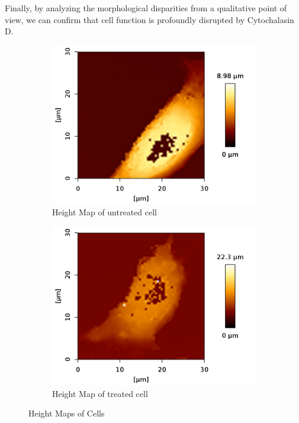 \documentclass[a4paper,english,12pt,bibliography=totoc]{scrreprt}
\begin{document}
Finally, by analyzing the morphological disparities from a qualitative point of view, we can confirm that cell function is profoundly disrupted by Cytochalasin D.


\begin{figure}[H]
    \begin{subfigure}{0.45\textwidth}
        \centering
        \includegraphics[width=\textwidth]{untreated/image.png}
        \caption{Height Map of untreated cell}
        \label{fig:ym_untreated}
    \end{subfigure}
    \begin{subfigure}{0.45\textwidth}
        \centering
        \includegraphics[width=\textwidth]{treated/image.png}
        \caption{Height Map of treated cell}
        \label{fig:ym_treated}
    \end{subfigure}
    \caption{Height Maps of Cells}
    \label{fig:main}
\end{figure}
\end{document}
